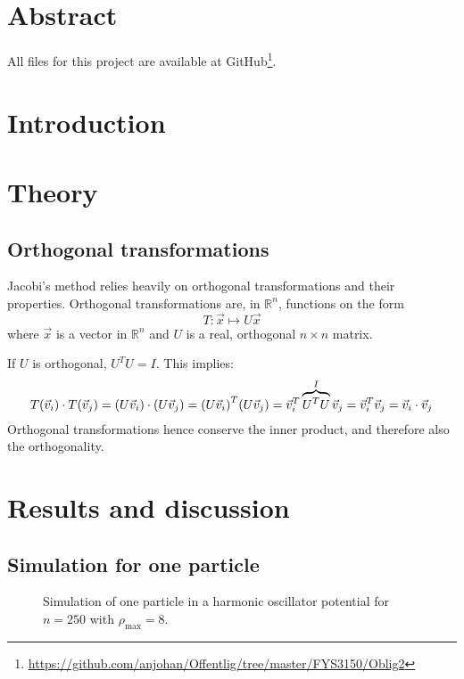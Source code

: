 \documentclass[12pt,english,a4paper]{report}
\newcommand{\R}{\mathbb{R}}
\begin{document}
%
\pagestyle{fancy}
\tableofcontents

\section{Abstract}

All files for this project are available at GitHub\footnote{\url{https://github.com/anjohan/Offentlig/tree/master/FYS3150/Oblig2}}.


\section{Introduction}





\section{Theory}





\subsection{Orthogonal transformations}
Jacobi's method relies heavily on orthogonal transformations and their properties. Orthogonal transformations are, in \(\R^n\), functions on the form
\[
T:\vec{x}\mapsto U\vec{x}
\]
where \(\vec{x}\) is a vector in \(\R^n\) and \(U\) is a real, orthogonal \(n\times n\) matrix.

If \(U\) is orthogonal, \(U^TU=I\). This implies:
\[
T(\vec{v}_i)\cdot T(\vec{v}_j) = \qty(U\vec{v}_i)\cdot\qty(U\vec{v}_j) = \qty(U\vec{v}_i)^T\qty(U\vec{v}_j) = \vec{v}_i^T\overbrace{U^TU}^I\vec{v}_j = \vec{v}_i^T\vec{v}_j=\vec{v}_i\cdot \vec{v}_j
\]
Orthogonal transformations hence conserve the inner product, and therefore also the orthogonality.

\section{Results and discussion}
\subsection{Simulation for one particle}
\begin{figure}[H]
\centering

\caption{Simulation of one particle in a harmonic oscillator potential for \(n=250\) with \(\rho_{\max}=8\).}
\end{figure}
\end{document}
